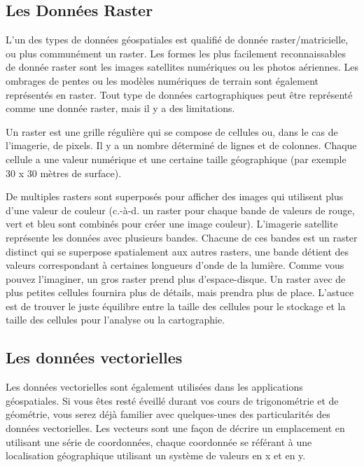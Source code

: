 \subsection{Les Données Raster}\label{label_rasterdata}

L'un des types de données géospatiales est qualifié de donnée raster/matricielle, ou plus communément un \og raster\fg. Les formes les plus facilement reconnaissables de donnée raster sont les images satellites numériques ou les photos aériennes. Les ombrages de pentes ou les modèles numériques de terrain sont également représentés en raster. Tout type de données cartographiques peut être représenté comme une donnée raster, mais il y a des limitations.

Un raster est une grille régulière qui se compose de cellules ou, dans le cas de l'imagerie, de pixels. Il y a un nombre déterminé de lignes et de colonnes. Chaque cellule a une valeur numérique et une certaine taille géographique (par exemple 30 x 30 mètres de surface).

De multiples rasters sont superposés pour afficher des images qui utilisent plus d'une valeur de couleur (c.-à-d. un raster pour chaque bande de valeurs de rouge, vert et bleu sont combinés pour créer une image couleur). L'imagerie satellite représente les données avec plusieurs bandes. Chacune de ces bandes est un raster distinct qui se superpose spatialement aux autres rasters, une bande détient des valeurs correspondant à certaines longueurs d'onde de la lumière. Comme vous pouvez l'imaginer, un gros raster prend plus d'espace-disque. Un raster avec de plus petites cellules fournira plus de détails, mais prendra plus de place. L'astuce est de trouver le juste équilibre entre la taille des cellules pour le stockage et la taille des cellules pour l'analyse ou la cartographie.

\subsection{Les données vectorielles}\label{label_vectordata}

Les données vectorielles sont également utilisées dans les applications géospatiales. Si vous êtes resté éveillé durant vos cours de trigonométrie et de géométrie, vous serez déjà familier avec quelques-unes des particularités des données vectorielles. Les vecteurs sont une façon de décrire un emplacement en utilisant une série de coordonnées, chaque coordonnée se référant à une localisation géographique utilisant un système de valeurs en x et en y.


